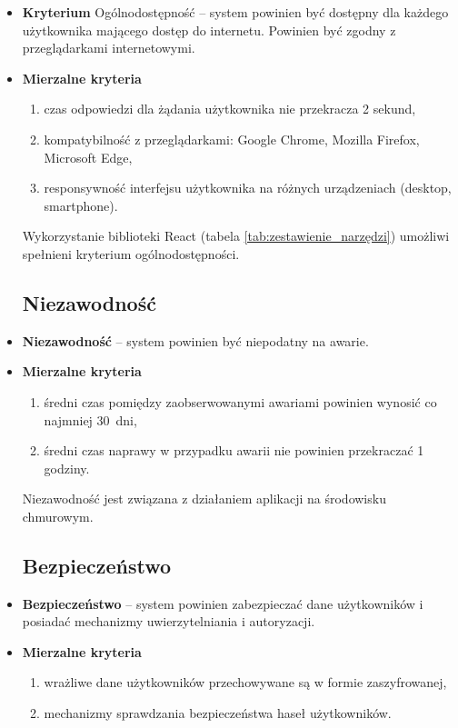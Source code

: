 \begin{itemize}
	\item \textbf{Kryterium} Ogólnodostępność -- system powinien być dostępny dla każdego użytkownika mającego dostęp do internetu. Powinien być zgodny z przeglądarkami internetowymi.
	\item \textbf{Mierzalne kryteria}
		\begin{enumerate}
			\item czas odpowiedzi dla żądania użytkownika nie przekracza 2 sekund,
			\item kompatybilność z przeglądarkami: Google Chrome, Mozilla Firefox, Microsoft Edge,
			\item responsywność interfejsu użytkownika na różnych urządzeniach (desktop, smartphone).
		\end{enumerate}
	Wykorzystanie biblioteki React (tabela \ref{tab:zestawienie_narzędzi}) umożliwi spełnieni kryterium ogólnodostępności.
		
\subsection{Niezawodność}
	\item \textbf{Niezawodność} -- system powinien być niepodatny na awarie.
	\item \textbf{Mierzalne kryteria}
		\begin{enumerate}
			\item średni czas pomiędzy zaobserwowanymi awariami powinien wynosić co najmniej 30~dni,
			\item średni czas naprawy w przypadku awarii nie powinien przekraczać 1 godziny.
		\end{enumerate}
	Niezawodność jest związana z działaniem aplikacji na środowisku chmurowym. 
	
	\subsection{Bezpieczeństwo}
	
	\item \textbf{Bezpieczeństwo} -- system powinien zabezpieczać dane użytkowników i posiadać mechanizmy uwierzytelniania i autoryzacji.
	\item \textbf{Mierzalne kryteria}
		\begin{enumerate}
			\item wrażliwe dane użytkowników przechowywane są w formie zaszyfrowanej,
			\item mechanizmy sprawdzania bezpieczeństwa haseł użytkowników.
		\end{enumerate}
		

\end{itemize}
